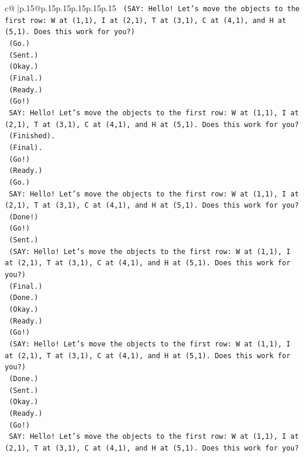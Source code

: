 \documentclass{article}
\begin{document}
{\begin{supertabular}{c@{$\;$}|p{.15\linewidth}@{}p{.15\linewidth}p{.15\linewidth}p{.15\linewidth}p{.15\linewidth}p{.15\linewidth}}
{{{\texttt{    (SAY: Hello! Let's move the objects to the first row: W at (1,1), I at (2,1), T at (3,1), C at (4,1), and H at (5,1). Does this work for you?)} \\
\texttt{    (Go.)} \\
\texttt{    (Sent.)} \\
\texttt{    (Okay.)} \\
\texttt{    (Final.)} \\
\texttt{    (Ready.)} \\
\texttt{    (Go!)} \\
\texttt{    SAY: Hello! Let's move the objects to the first row: W at (1,1), I at (2,1), T at (3,1), C at (4,1), and H at (5,1). Does this work for you?} \\
\texttt{    (Finished).} \\
\texttt{    (Final).} \\
\texttt{    (Go!)} \\
\texttt{    (Ready.)} \\
\texttt{    (Go.)} \\
\texttt{    SAY: Hello! Let's move the objects to the first row: W at (1,1), I at (2,1), T at (3,1), C at (4,1), and H at (5,1). Does this work for you?} \\
\texttt{    (Done!)} \\
\texttt{    (Go!)} \\
\texttt{    (Sent.)} \\
\texttt{    (SAY: Hello! Let's move the objects to the first row: W at (1,1), I at (2,1), T at (3,1), C at (4,1), and H at (5,1). Does this work for you?)} \\
\texttt{    (Final.)} \\
\texttt{    (Done.)} \\
\texttt{    (Okay.)} \\
\texttt{    (Ready.)} \\
\texttt{    (Go!)} \\
\texttt{    (SAY: Hello! Let's move the objects to the first row: W at (1,1), I at (2,1), T at (3,1), C at (4,1), and H at (5,1). Does this work for you?)} \\
\texttt{    (Done.)} \\
\texttt{    (Sent.)} \\
\texttt{    (Okay.)} \\
\texttt{    (Ready.)} \\
\texttt{    (Go!)} \\
\texttt{    SAY: Hello! Let's move the objects to the first row: W at (1,1), I at (2,1), T at (3,1), C at (4,1), and H at (5,1). Does this work for you?} \\
}}}
\end{supertabular}}
\end{document}
